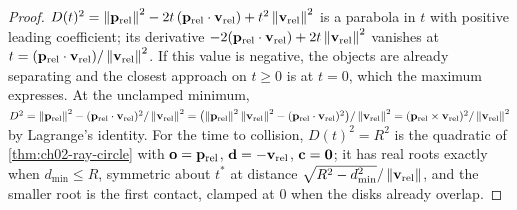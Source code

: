 \begin{proof}
$D(t)^2=\left\lVert \mathbf{p}_{\mathrm{rel}} \right\rVert^2-2t\,(\mathbf{p}_{\mathrm{rel}}\cdot\mathbf{v}_{\mathrm{rel}})+t^2\left\lVert \mathbf{v}_{\mathrm{rel}} \right\rVert^2$ is a parabola in $t$ with positive leading coefficient; its derivative $-2(\mathbf{p}_{\mathrm{rel}}\cdot\mathbf{v}_{\mathrm{rel}})+2t\left\lVert \mathbf{v}_{\mathrm{rel}} \right\rVert^2$ vanishes at $t=(\mathbf{p}_{\mathrm{rel}}\cdot\mathbf{v}_{\mathrm{rel}})/\left\lVert \mathbf{v}_{\mathrm{rel}} \right\rVert^2$. If this value is negative, the objects are already separating and the closest approach on $t\ge0$ is at $t=0$, which the maximum expresses. At the unclamped minimum, $D^2=\left\lVert \mathbf{p}_{\mathrm{rel}} \right\rVert^2-(\mathbf{p}_{\mathrm{rel}}\cdot\mathbf{v}_{\mathrm{rel}})^2/\left\lVert \mathbf{v}_{\mathrm{rel}} \right\rVert^2=\bigl(\left\lVert \mathbf{p}_{\mathrm{rel}} \right\rVert^2\left\lVert \mathbf{v}_{\mathrm{rel}} \right\rVert^2-(\mathbf{p}_{\mathrm{rel}}\cdot\mathbf{v}_{\mathrm{rel}})^2\bigr)/\left\lVert \mathbf{v}_{\mathrm{rel}} \right\rVert^2=(\mathbf{p}_{\mathrm{rel}}\times\mathbf{v}_{\mathrm{rel}})^2/\left\lVert \mathbf{v}_{\mathrm{rel}} \right\rVert^2$ by Lagrange's identity. For the time to collision, $D(t)^2=R^2$ is the quadratic of \cref{thm:ch02-ray-circle} with $\mathbf{o}=\mathbf{p}_{\mathrm{rel}}$, $\mathbf{d}=-\mathbf{v}_{\mathrm{rel}}$, $\mathbf{c}=\mathbf{0}$; it has real roots exactly when $d_{\min}\le R$, symmetric about $t^*$ at distance $\sqrt{R^2-d_{\min}^2}/\left\lVert \mathbf{v}_{\mathrm{rel}} \right\rVert$, and the smaller root is the first contact, clamped at $0$ when the disks already overlap. \qedhere
\end{proof}

